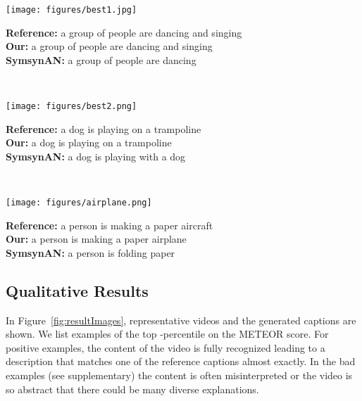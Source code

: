 \documentclass[runningheads,table]{llncs}
\begin{document}
\begin{figure*}[ht]
  { \centering
    \parbox{.90\linewidth}{
          \parbox{0.25\linewidth}{
    \texttt{[image: figures/best1.jpg]}} 
      \parbox{0.65\linewidth}{ 
      \scriptsize{\textbf{Reference:}
      a group of people are dancing and singing}\\
      \scriptsize{\textbf{Our:}
      a group of people are dancing and singing}\\
       \scriptsize{\textbf{SymsynAN:}
      a group of people are dancing}}}
      \\
      \parbox{.90\linewidth}{
    \parbox{0.25\linewidth}{
    \texttt{[image: figures/best2.png]} }
      \parbox{0.65\linewidth}{ 
      \scriptsize{\textbf{Reference:}
      a dog is playing on a trampoline}\\
      \scriptsize{\textbf{Our:}
     a dog is playing on a trampoline}\\
       \scriptsize{\textbf{SymsynAN:}
     a dog is playing with a dog}}}
   \\
    \parbox{.90\linewidth}{
        \parbox{0.25\linewidth}{
    \texttt{[image: figures/airplane.png]}} 
      \parbox{0.65\linewidth}{ 
      \scriptsize{\textbf{Reference:}
      a person is making a paper aircraft}\\
      \scriptsize{\textbf{Our:}
     a person is making a paper airplane}\\
       \scriptsize{\textbf{SymsynAN:}
     a person is folding paper}}}
    
   }
 \vspace{-0.3cm}

    






  
    \caption{Examples for the top-performing videos in the test set.}\label{fig:resultImages}
\end{figure*}

\subsection{Qualitative Results}\label{example_result}
\label{sec:exampleResults}
In Figure~\ref{fig:resultImages}, representative videos and the generated captions are shown. 
We list examples of the top -percentile on the METEOR score.
For positive examples, the content of the video is fully recognized leading to a description that matches one of the reference captions almost exactly. In the bad examples (see supplementary) the content is often misinterpreted or the video is so abstract that there could be many diverse explanations. 
\end{document}
